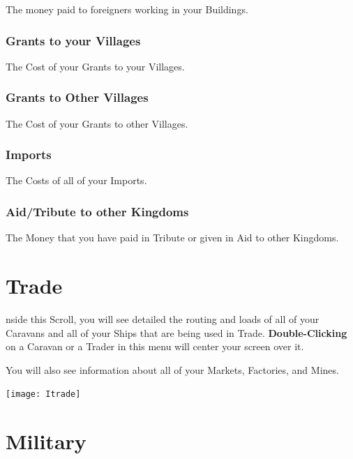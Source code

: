 The money paid to foreigners working in your Buildings.

\subsubsection{\textsf{Grants to your Villages}}

The Cost of your Grants to your Villages.

\subsubsection{\textsf{Grants to Other Villages}}

The Cost of your Grants to other Villages.

\subsubsection{\textsf{Imports}}

The Costs of all of your Imports.

\subsubsection{\textsf{Aid/Tribute to other Kingdom}s}

The Money that you have paid in Tribute or given in Aid to other Kingdoms.

\section{\textsf{Trade}}



nside this Scroll, you will see detailed the routing and loads of all of your Caravans and all of your Ships that are being used in Trade. \textbf{Double-Clicking} on a Caravan or a Trader in this menu will center your screen over it.


You will also see information about all of your Markets, Factories, and Mines.

\begin{center}
	\texttt{[image: Itrade]}
\end{center}

\section{\textsf{Military}}

